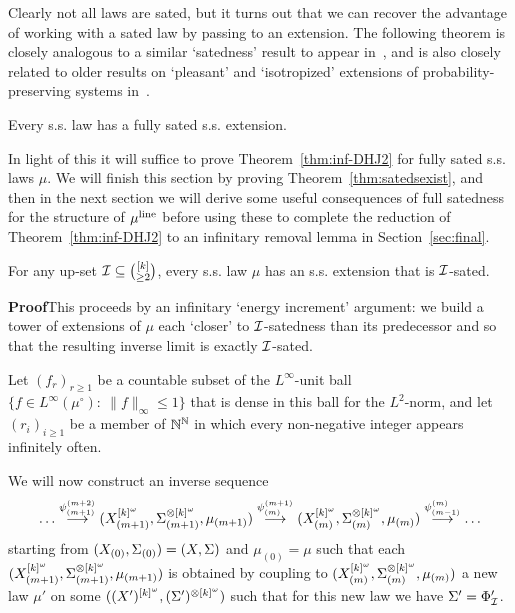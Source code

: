\documentclass[11pt]{article}
\begin{document}
Clearly not all laws are sated, but it turns out that we can recover
the advantage of working with a sated law by passing to an
extension.  The following theorem is closely analogous to a similar
`satedness' result to appear in~\cite{Aus--lindeppleasant}, and is
also closely related to older results on `pleasant' and
`isotropized' extensions of probability-preserving systems
in~\cite{Aus--newmultiSzem,Aus--nonconv}.

\begin{thm}\label{thm:satedsexist}
Every s.s. law has a fully sated s.s. extension.
\end{thm}

In light of this it will suffice to prove Theorem~\ref{thm:inf-DHJ2}
for fully sated s.s. laws $\mu$.  We will finish this section by
proving Theorem~\ref{thm:satedsexist}, and then in the next section
we will derive some useful consequences of full satedness for the
structure of $\mu^\line$ before using these to complete the
reduction of Theorem~\ref{thm:inf-DHJ2} to an infinitary removal
lemma in Section~\ref{sec:final}.

\begin{lem}
For any up-set $\I\subseteq \binom{[k]}{\geq 2}$, every s.s. law
$\mu$ has an s.s. extension that is $\I$-sated.
\end{lem}

\textbf{Proof}\quad This proceeds by an infinitary `energy
increment' argument: we build a tower of extensions of $\mu$ each
`closer' to $\I$-satedness than its predecessor and so that the
resulting inverse limit is exactly $\I$-sated.

Let $(f_r)_{r\geq 1}$ be a countable subset of the $L^\infty$-unit
ball $\{f\in L^\infty(\mu^\circ):\ \|f\|_\infty\leq 1\}$ that is
dense in this ball for the $L^2$-norm, and let $(r_i)_{i\geq 1}$ be
a member of $\bbN^\bbN$ in which every non-negative integer appears
infinitely often.

We will now construct an inverse sequence
\[\ldots\stackrel{\psi^{(m+2)}_{(m+1)}}{\longrightarrow}(X_{(m+1)}^{[k]^\o},\S^{\otimes [k]^\o}_{(m+1)},\mu_{(m+1)})\stackrel{\psi^{(m+1)}_{(m)}}{\longrightarrow} (X^{[k]^\o}_{(m)},\S^{\otimes [k]^\o}_{(m)},\mu_{(m)})\stackrel{\psi^{(m)}_{(m-1)}}{\longrightarrow}\ldots\]
starting from $(X_{(0)},\S_{(0)}) = (X,\S)$ and $\mu_{(0)} = \mu$
such that each $(X_{(m+1)}^{[k]^\o},\S^{\otimes
[k]^\o}_{(m+1)},\mu_{(m+1)})$ is obtained by coupling to
$(X_{(m)}^{[k]^\o},\S^{\otimes [k]^\o}_{(m)},\mu_{(m)})$ a new law
$\mu'$ on some $((X')^{[k]^\o},(\S')^{\otimes [k]^\o})$ such that
for this new law we have $\S' = \Phi'_\I$.
\end{document}
